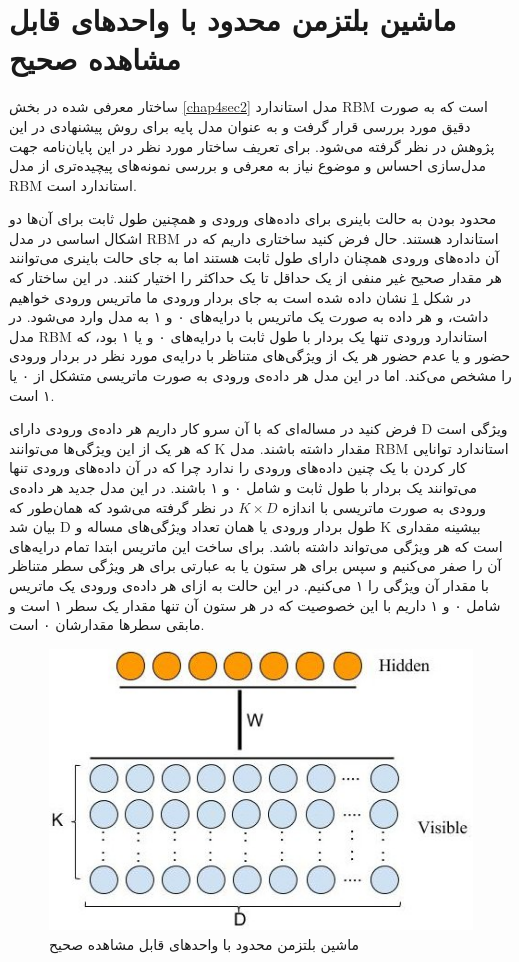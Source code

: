 \section{ماشین بلتزمن محدود با واحدهای قابل مشاهده صحیح}
\label{chap4sec3}
ساختار معرفی‌ شده در بخش
\ref{chap4sec2}
مدل استاندارد
RBM
است که به صورت دقیق مورد بررسی‌ قرار گرفت و به عنوان مدل پایه برای روش پیشنهادی در این پژوهش در نظر گرفته می‌‌شود. برای تعریف ساختار مورد نظر در این پایان‌‌نامه جهت مدل‌سازی احساس و موضوع نیاز به معرفی‌ و بررسی‌ نمونه‌های پیچیده‌تری از مدل
RBM
استاندارد است.

محدود بودن به حالت باینری برای داده‌های ورودی و همچنین طول ثابت برای آن‌ها دو اشکال اساسی در مدل
RBM
استاندارد هستند. حال فرض کنید ساختاری داریم که در آن داده‌های ورودی همچنان دارای طول ثابت هستند اما به جای حالت باینری می‌‌توانند هر مقدار صحیح غیر منفی‌ از یک حداقل تا یک حداکثر را اختیار کنند. در این ساختار که در شکل
\ref{chap4-fig2}
نشان داده شده است به جای بردار ورودی ما ماتریس ورودی خواهیم داشت، و هر داده به صورت یک ماتریس با درایه‌های ۰ و ۱ به مدل وارد می‌‌شود. در مدل
RBM
استاندارد ورودی تنها یک بردار با طول ثابت با درایه‌های ۰ و یا ۱ بود، که حضور و یا عدم حضور هر یک از ویژگی‌‌های متناظر با درایه‌ی مورد نظر در بردار ورودی را مشخص می‌‌کند. اما در این مدل هر داده‌ی ورودی به صورت ماتریسی متشکل از ۰ یا ۱ است.

فرض کنید در مساله‌ای‌ که با آن سرو کار داریم هر داده‌ی ورودی دارای
D
ویژگی‌ است که هر یک از این ویژگی‌ها می‌‌توانند 
K
مقدار داشته باشند. مدل
RBM
استاندارد توانایی کار کردن با یک چنین داده‌های ورودی را ندارد چرا که در آن داده‌های ورودی تنها می‌‌توانند یک بردار با طول ثابت و شامل ۰ و ۱ باشند. در این مدل جدید هر داده‌ی ورودی به صورت ماتریسی با اندازه
$K \times D$
در نظر گرفته می‌شود که همان‌طور که بیان شد
D
طول بردار ورودی یا همان تعداد ویژگی‌های مساله و
K
بیشینه مقداری است که هر ویژگی‌ می‌‌تواند داشته باشد. برای ساخت این ماتریس ابتدا تمام درایه‌های آن را صفر می‌‌کنیم و سپس برای هر ستون یا به عبارتی برای هر ویژگی‌ سطر متناظر با مقدار آن ویژگی‌ را ۱ می‌‌کنیم. در این حالت به ازای هر داده‌ی ورودی یک ماتریس شامل ۰ و ۱ داریم با این خصوصیت که در هر ستون آن تنها مقدار یک سطر  ۱ است و مابقی سطرها مقدارشان ۰ است.
\begin{figure}[!t]
	\centering
	\includegraphics[scale=0.5]{chap4-img/MRBM}
	\caption{ماشین بلتزمن محدود با واحدهای قابل مشاهده صحیح}
	\label{chap4-fig2}
\end{figure}

